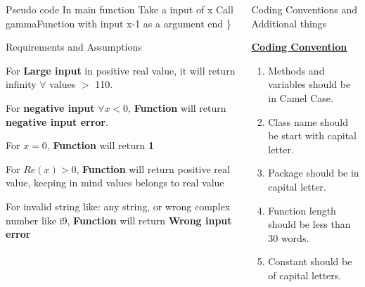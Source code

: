 \documentclass[final]{beamer}
\newlength{\onecolwid}
\newlength{\twocolwid}
\begin{document}
\begin{frame}
\begin{columns}[t]
\begin{column}{\twocolwid}
\begin{columns}[t,totalwidth=\twocolwid]
\begin{column}{\onecolwid}
\begin{exampleblock}{Pseudo code}
{In main function \newline
\hspace*{20pt} Take a input of x \newline
\hspace*{20pt} Call gammaFunction with input x-1 as a argument \newline
end
\}}
\end{exampleblock}
\begin{exampleblock}{Requirements and Assumptions}
\begin{itemize}
    \small{\item  For \textbf{Large input} in positive real value, it will return infinity $\forall$ values $>$ 110.
    \item  For \textbf{negative input} $\forall x<0 $, \textbf{Function} will return \textbf{negative input error}.
    \item  For \textbf{$x=0$}, \textbf{Function} will return \textbf{1}
    \item  For \textbf{$Re(x) > 0$}, \textbf{Function} will return positive real value, keeping in mind values belongs to real value}
    \item For invalid string like: any string, or wrong complex number like i9, \textbf{Function} will return \textbf{Wrong input error}
\end{itemize}

\end{exampleblock}

\end{column} %

\begin{column}{\onecolwid}\vspace{-.74in} %


\begin{exampleblock}{Coding Conventions and Additional things}

\small{\textbf{\underline{Coding Convention}}
\begin{enumerate}
    \item Methods and variables should be in Camel Case. 
    \item Class name should be start with capital letter.
    \item Package should be in capital letter.
    \item Function length should be less than 30 words.
    \item Constant should be of capital letters.
\end{enumerate}

}
\end{exampleblock}
\end{column}
\end{columns}
\end{column}
\end{columns}
\end{frame}
\end{document}
